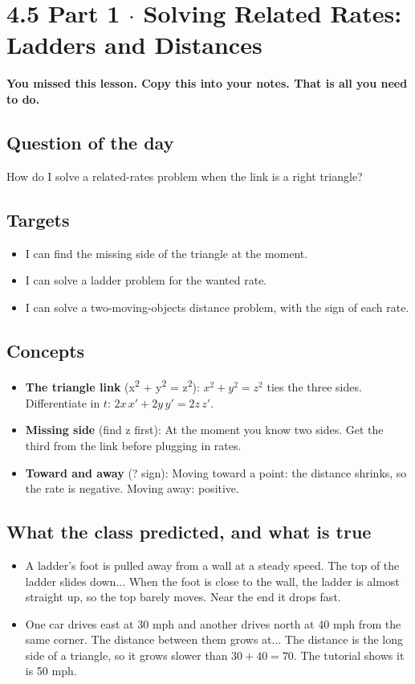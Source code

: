 \documentclass[11pt]{article}
\begin{document}
\section*{4.5 Part 1 $\cdot$ Solving Related Rates: Ladders and Distances}
\textbf{You missed this lesson. Copy this into your notes. That is all you need to do.}\par\medskip
\subsection*{Question of the day}
How do I solve a related-rates problem when the link is a right triangle?\par
\subsection*{Targets}\begin{itemize}\item I can find the missing side of the triangle at the moment.
\item I can solve a ladder problem for the wanted rate.
\item I can solve a two-moving-objects distance problem, with the sign of each rate.\end{itemize}
\subsection*{Concepts}\begin{itemize}
\item \textbf{The triangle link} (x\textsuperscript{2} + y\textsuperscript{2} = z\textsuperscript{2}): $x^2+y^2=z^2$ ties the three sides. Differentiate in $t$: $2x\,x'+2y\,y'=2z\,z'$.
\item \textbf{Missing side} (find z first): At the moment you know two sides. Get the third from the link before plugging in rates.
\item \textbf{Toward and away} (? sign): Moving toward a point: the distance shrinks, so the rate is negative. Moving away: positive.
\end{itemize}
\subsection*{What the class predicted, and what is true}\begin{itemize}
\item A ladder's foot is pulled away from a wall at a steady speed. The top of the ladder slides down...  When the foot is close to the wall, the ladder is almost straight up, so the top barely moves. Near the end it drops fast.
\item One car drives east at 30 mph and another drives north at 40 mph from the same corner. The distance between them grows at...  The distance is the long side of a triangle, so it grows slower than $30+40=70$. The tutorial shows it is 50 mph.
\end{itemize}
\end{document}
